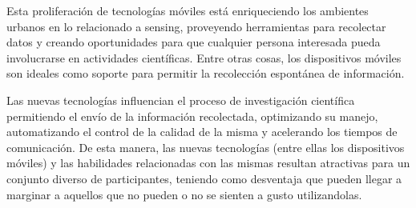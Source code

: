 	Esta proliferación de tecnologías móviles está enriqueciendo los ambientes urbanos en lo relacionado a sensing, proveyendo herramientas para recolectar datos y creando oportunidades para que cualquier persona interesada pueda involucrarse en actividades científicas. Entre otras cosas, los dispositivos móviles son ideales como soporte para permitir la recolección espontánea de información. \cite{kim2013sensr}
	
	Las nuevas tecnologías influencian el proceso de investigación científica permitiendo el envío de la información recolectada, optimizando su manejo, automatizando el control de la calidad de la misma y acelerando los tiempos de comunicación. De esta manera, las nuevas tecnologías (entre ellas los dispositivos móviles) y las habilidades relacionadas con las mismas resultan atractivas para un conjunto diverso de participantes, teniendo como desventaja que pueden llegar a marginar a aquellos que no pueden o no se sienten a gusto utilizandolas. \cite{newman2012future}
